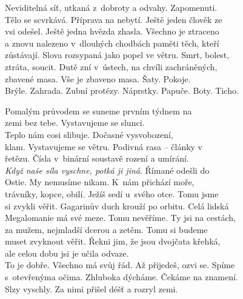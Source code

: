 \medskip

\noindent
Neviditelná síť, utkaná z dobroty a odvahy. Zapomenuti. \\
\noindent
Tělo se scvrkává. Příprava na nebytí. Ještě jeden člověk ze \\
\noindent
vsi odešel. Ještě jedna hvězda zhasla. Všechno je ztraceno \\
\noindent
a znovu nalezeno v dlouhých chodbách paměti těch, kteří \\
\noindent
zůstávají. Slova rozsypaná jako popel ve větru. Smrt, bolest, \\
\noindent
ztráta, soucit. Dutě zní v ústech, na chvíli zachráněných, \\
\noindent
zbavené masa. Vše je zbaveno masa. Šaty. Pokoje. \\
\noindent
Brýle. Zahrada. Zubní protézy. Náprstky. Papuče. Boty. Ticho. \\

\medskip

\noindent
Pomalým průvodem se suneme prvním týdnem na  \\
\noindent
zemi bez tebe. Vystavujeme se slunci. \\
\noindent
Teplo nám cosi slibuje. Dočasné vysvobození, \\
\noindent
klam. Vystavujeme se větru. Podivná rasa -- články v \\
\noindent
řetězu. Čísla v binární soustavě rození a umírání. \\
\noindent
\textit{Když naše síla vyschne, potká ji jiná}. Římané odešli do \\
\noindent
Ostie. My nemusíme nikam. K nám přichází moře, \\
\noindent
trávníky, kopce, obilí. Ježíš sedí u~svého otce.  Tomu jsme \\
\noindent
si zvykli věřit. Gagarinův duch krouží po orbitu. Celá lidská \\
\noindent
Megalomanie má své meze. Tomu nevěříme. Ty jsi na cestách, \\
\noindent
za mužem, nejmladší dcerou a zetěm. Tomu si budeme \\
\noindent
muset zvyknout věřit. Řekni jim, že jsou dvojčata křehká,  \\
\noindent
ale celou dobu jsi je učila odvaze. \\
\noindent
To je dobře. Všechno má svůj řád. Až přijedeš, ozvi se. Spíme \\
\noindent
s otevřenýma očima. Zhluboka dýcháme. Čekáme na znamení.  \\
\noindent
Slzy vyschly. Za nimi přišel déšť a rozryl zemi. \\
\medskip

